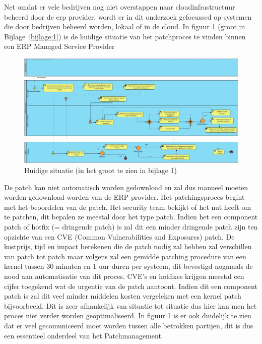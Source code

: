 Net omdat er vele bedrijven nog niet overstappen naar cloudinfrastructuur beheerd door de erp provider, wordt er in dit onderzoek gefocussed op systemen die door bedrijven beheerd worden, lokaal of in de cloud. In figuur 1 (groot in Bijlage~\ref{bijlage:1}) is de huidige situatie van het patchproces te vinden binnen een ERP Managed Service Provider \\

\begin{figure}[htbp]
    \centering
    \includegraphics[width=\textwidth]{huidigesituatie.jpg}
    \caption{Huidige situatie (in het groot te zien in bijlage 1)}
    \label{fig:huidigesituatie}
\end{figure}

De patch kan niet automatisch worden gedownload en zal dus manueel moeten worden gedownload worden van de ERP provider. Het patchingsproces begint met het beoordelen van de patch. Het security team bekijkt of het nut heeft
om te patchen, dit bepalen ze meestal door het type patch. Indien het een component patch of hotfix (= dringende patch) is zal dit een minder dringende patch zijn ten opzichte van een CVE (Common Vulnerabilities and Exposures) patch. De kostprijs, tijd en impact berekenen
die de patch nodig zal hebben zal verschillen van patch tot patch maar volgens \textcite{Heyndrickx2024} zal een gemidde patching procedure van een kernel tussen 30 minuten en 1 uur duren per systeem, dit bevestigd nogmaals de nood aan automatisatie van dit proces. CVE's en hotfixes krijgen meestal een cijfer toegekend wat de urgentie van de patch aantoont. Indien dit een component patch is zal dit veel minder middelen kosten vergeleken
met een kernel patch bijvoorbeeld. Dit is zeer afhankelijk van situatie tot situatie dus hier kan men het proces niet verder worden geoptimaliseerd. In figuur 1 is er ook duidelijk te zien dat er veel gecomuniceerd moet worden tussen alle betrokken partijen, dit is dus een essentieel onderdeel van het Patchmanagement. \\


